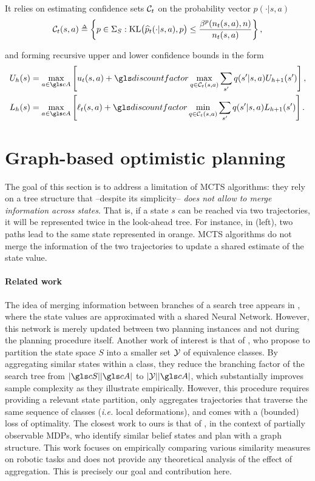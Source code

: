 It relies on estimating confidence sets $\mathcal{C}_t$ on the probability vector $p(\cdot|s,a)$
$$\cC_t(s,a) \eqdef \left\{p\in \Sigma_S :  \KL\!\big(\hp_t(\cdot|s,a),p\big) \leq \frac {\beta^p(n_t(s,a), n)} {n_t(s,a)}\right\},$$

and forming recursive upper and lower confidence bounds in the form
\begin{align*}
U_{h}(s) &= \max_{a\in \cA} \left[u_t(s,a) + \discount \max_{q \in \cC_t(s,a)} \sum_{s'} q(s'|s,a) U_{h+1}(s')\right], \\
L_{h}(s) &= \max_{a\in \cA} \left[\ell_t(s,a) + \discount \min_{q \in \cC_t(s,a)} \sum_{s'} q(s'|s,a)L_{h+1}(s')\right].
\end{align*}

\section{Graph-based optimistic planning}
\label{sec:gbop}


The goal of this section is to address a limitation of \gls{MCTS} algorithms: they rely on a tree structure that  --despite its simplicity-- \emph{does not allow to merge information across states}. That is, if a state $s$ can be reached via two trajectories, it will be represented twice in the look-ahead tree. For instance, in  (left), two paths lead to the same state represented in orange. \gls{MCTS} algorithms do not merge the information of the two trajectories to update a shared estimate of the state value.

\paragraph{Related work}

The idea of merging information between branches of a search tree appears in \citep{Silver2018}, where the state values are approximated with a shared Neural Network. However, this network is merely updated between two planning instances and not during the planning procedure itself.
Another work of interest is that of \citet{Hostetler14}, who propose to partition the state space $S$ into a smaller set $\mathcal{Y}$ of equivalence classes. By aggregating similar states within a class, they reduce the branching factor of the search tree from $|\cS||\cA|$ to $|\cY||\cA|$, which substantially improves sample complexity as they illustrate empirically. However, this procedure requires providing a relevant state partition, only aggregates trajectories that traverse the same sequence of classes (\emph{i.e.} local deformations), and comes with a (bounded) loss of optimality.
The closest work to ours is that of \citet{Ballesteros2013}, in the context of partially observable \glspl{MDP}, who identify similar belief states and plan with a graph structure. This work focuses on empirically comparing various similarity measures on robotic tasks and does not provide any theoretical analysis of the effect of aggregation. This is precisely our goal and contribution here.

